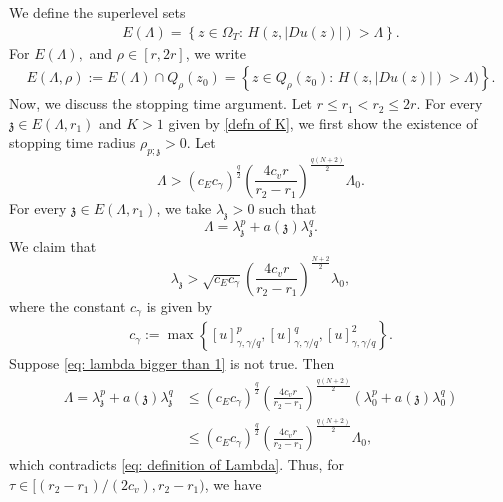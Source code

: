\documentclass[10pt,a4paper]{amsart}
\numberwithin{equation}{section}
\begin{document}
We define the superlevel sets
\begin{align}\label{Defn E_lambda}
E(\Lambda)=\left\{z \in \Omega_T:\, H\left(z, |Du(z)|\right)>\Lambda\right\}.
\end{align}
For $E(\Lambda),$ and $\rho\in [r,2r]$, we write
\begin{align}\label{defn_E(Lambda, rho)}
E(\Lambda,\rho):=E(\Lambda)\cap Q_{\rho}(z_0)=\left\{z \in Q_{\rho}(z_0):\, H(z, |Du(z)|)>\Lambda)\right\}.
\end{align}
Now, we discuss the stopping time argument. Let $r\leq r_1< r_2\leq 2r.$ For every $\mathfrak{z} \in E(\Lambda,r_1)$ and $K>1$ given by \eqref{defn of K},  we first show the existence of stopping time radius $\rho_{p; \mathfrak z}>0.$ Let
\begin{equation}    \label{eq: definition of Lambda}
    \Lambda >(c_Ec_{\gamma})^{\frac{q}{2}} \left(\frac{4c_v r}{r_2-r_1}\right)^\frac{q(N+2)}{2}\Lambda_0.
\end{equation}
For every $\mathfrak{z} \in E(\Lambda,r_1)$, we take $\lambda_\mathfrak{z}>0$ such that 
\begin{equation}    \label{eq: definition of lambda z}
\Lambda=\lambda_\mathfrak{z}^p+a(\mathfrak{z})\lambda_\mathfrak{z}^q.
\end{equation}
We claim that 
\begin{equation} \label{eq: lambda bigger than 1}
    \lambda_\mathfrak{z}>\sqrt{c_Ec_{\gamma}}\left(\frac{4c_v r}{r_2-r_1}\right)^\frac{N+2}{2}\lambda_0,
\end{equation}
where the constant $c_{\gamma}$ is given by
\begin{align}\label{defn of cgamma}
 c_{\gamma}:=\max\left\{[u]^p_{\gamma, \gamma/q}, [u]^q_{\gamma, \gamma/q}, [u]^2_{\gamma, \gamma/q}\right\}.   
\end{align}
Suppose \eqref{eq: lambda bigger than 1} is not true. Then 
\begin{align*}    
\Lambda=\lambda_\mathfrak{z}^p+a(\mathfrak{z})\lambda_\mathfrak{z}^q
&\leq (c_Ec_{\gamma})^{\frac{q}{2}}\left(\frac{4c_v r}{r_2-r_1}\right)^\frac{q(N+2)}{2}(\lambda_0^p+a(\mathfrak{z})\lambda_0^q)\\
&\leq (c_Ec_{\gamma})^{\frac{q}{2}}\left(\frac{4c_v r}{r_2-r_1}\right)^\frac{q(N+2)}{2}\Lambda_0,
\end{align*}
which contradicts \eqref{eq: definition of Lambda}. Thus, for $\tau\in[(r_2-r_1)/(2c_v),r_2-r_1)$, we have 
\end{document}
